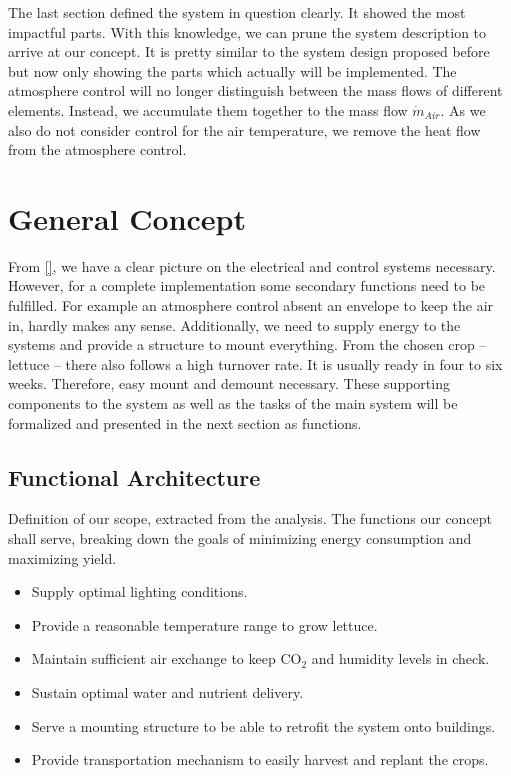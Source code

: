 The last section defined the system in question clearly.
It showed the most impactful parts.
With this knowledge, we can prune the system description to arrive at our concept.
It is pretty similar to the system design proposed before but now only showing the parts which actually will be implemented.
The atmosphere control will no longer distinguish between the mass flows of different elements.
Instead, we accumulate them together to the mass flow $\dot{m}_{Air}$.
As we also do not consider control for the air temperature, we remove the heat flow from the atmosphere control.



\section{General Concept}
\label{sec:concept}
From \ref{}, we have a clear picture on the electrical and control systems necessary.
However, for a complete implementation some secondary functions need to be fulfilled.
For example an atmosphere control absent an envelope to keep the air in, hardly makes any sense.
Additionally, we need to supply energy to the systems and provide a structure to mount everything.
From the chosen crop -- lettuce -- there also follows a high turnover rate.
It is usually ready in four to six weeks.
Therefore, easy mount and demount necessary.
These supporting components to the system as well as the tasks of the main system will be formalized and presented in the next section as functions.

\subsection{Functional Architecture}
\label{sub:func-arch}
Definition of our scope, extracted from the analysis.
The functions our concept shall serve, breaking down the goals of minimizing energy consumption and maximizing yield.
\begin{itemize}
	\item Supply optimal lighting conditions.
	\item Provide a reasonable temperature range to grow lettuce.
	\item Maintain sufficient air exchange to keep CO$_2$ and humidity levels in check.
	\item Sustain optimal water and nutrient delivery.
	\item Serve a mounting structure to be able to retrofit the system onto buildings.
	\item Provide transportation mechanism to easily harvest and replant the crops.

\end{itemize}

